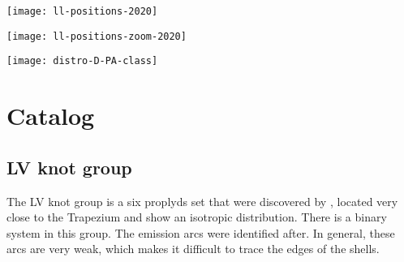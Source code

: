 \documentclass[apj, twocolumn]{aastex63}
\newcommand\thC{\ensuremath{\theta^1\,\mathrm{Ori~C}}}
\begin{document}
\begin{figure*}
  \texttt{[image: ll-positions-2020]}
  \caption{Position of bow shock arcs. The light blue circle symbols
    are the bow shocks. The outer and inner traced arcs are represented
    by the green and purple curved lines, respectively. The 
    thin gray circle outlines show the fit to the arc points. The green and purple arrows
    indicate the orientation of the outer and inner arcs, respectively.
    The light blue circle symbols without traced arcs indicate the
    objects that belong to the ambiguous category. The symbols with orange
    box label are interproplyd bow shock arcs. Objects from \citet{Ricci:2008a}
    are also included. Red symbols represent the
    classic proplyds, the black circle symbols are the typical accretion
    disks, the green ones indicate radiative jets without evidence of
    the presence of either ionized disks or silhouette disks and
    cyan symbols are reflection nebulae with no external emission
    of ionized gas. The gray box indicates the regions around of Trapezium
    which is the magnified region in Figure~\ref{fig:pos-image-zoom}.}
  \label{fig:pos-image}
\end{figure*}

\begin{figure*}
  \texttt{[image: ll-positions-zoom-2020]}
  \caption{Position of bow shock arcs. Zoomed area around of Trapezium, which
    corresponds gray box of Figure~\ref{fig:pos-image}.}
  \label{fig:pos-image-zoom}
\end{figure*}

\begin{figure*}
  \centering
  \texttt{[image: distro-D-PA-class]}
  \caption{Position angle of bow shock location as a function of distance,
    both measured from \thC. 
  }
  \label{fig:PA-v-distance}
\end{figure*}

\section{Catalog}
\label{sec:catalog}

\subsection{LV knot group}
\label{sec:lv-group}



The LV knot group is a six proplyds set that were discovered by
\citet{Laques:1979a}, located very close to the Trapezium and show
an isotropic distribution. There is a binary system in this group.
The emission arcs were identified after. In general, these arcs
are very weak, which makes it difficult to trace the edges of the
shells.
\end{document}
